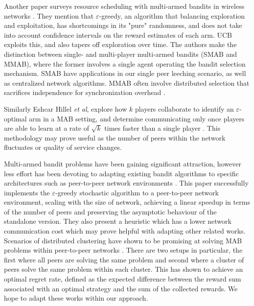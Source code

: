 \documentclass{article}
\begin{document}
Another paper surveys resource scheduling with multi-armed bandits in wireless networks \cite{mab_wireless_scheduling_survey}. They mention that $\varepsilon$-greedy, an 
algorithm that balancing exploration and exploitation, has shortcomings in its "pure" randomness, and does not take into account confidence intervals on the reward estimates 
of each arm. UCB exploits this, and also tapers off exploration over time. The authors make the distinction between single- and multi-player multi-armed bandits (SMAB and 
MMAB), where the former involves a single agent operating the bandit selection mechanism. SMAB have applications in our single peer leeching scenario, as well as centralized 
network algorithms. MMAB often involve distributed selection that sacrifices independence for synchronization overhead \cite{mab_wireless_scheduling_survey}.

Similarly Eshcar Hillel \textit{et al}, explore how $k$ players collaborate to identify an $\varepsilon$-optimal arm in a MAB setting, and determine communicating only
once players are able to learn at a rate of $\sqrt{k}$ times faster than a single player \cite{mab_dist_exploration}. This methodology may prove useful as the number of 
peers within the network fluctuates or quality of service changes. 

Multi-armed bandit problems have been gaining significant attraction, however less effort has been devoting to adapting existing bandit algorithms to specific architectures 
such as peer-to-peer network environments \cite{gossip_based_distrivuted_stochastic}. This paper successfully implements the $\varepsilon$-greedy stochastic algorithm to a 
peer-to-peer network environment, scaling with the size of network, achieving a linear speedup in terms of the number of peers and preserving the asymptotic behaviour of the 
standalone version. They also present a heuristic which has a lower network communication cost which may prove helpful with adapting other related works. Scenarios of 
distributed clustering have shown to be promising at solving MAB problems within peer-to-peer networks \cite{dist_clustering_p2p}. There are two setups in particular, the 
first where all peers are solving the same problem and second where a cluster of peers solve the same problem within each cluster. This has shown to achieve an optimal regret 
rate, defined as the expected difference between the reward sum associated with an optimal strategy and the sum of the collected rewards. We hope to adapt these works within 
our approach.
\end{document}
